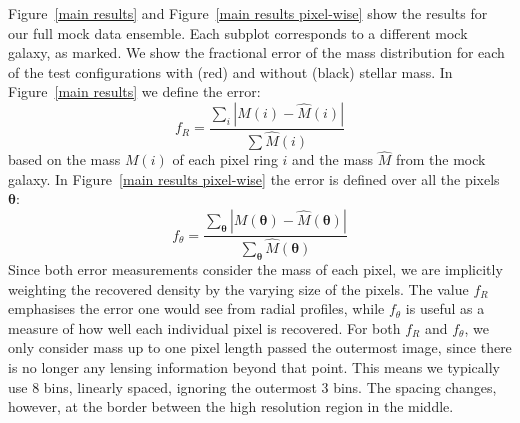 \documentclass[galley,usenatbib]{mn2e}
\renewcommand{\vec}[1]{\ensuremath{\boldsymbol{#1}}}
\newcommand{\figref}[1] {Figure~\ref{#1}}
\begin{document}
\figref{main results} and \figref{main results pixel-wise} show the results for
our full mock data ensemble. Each subplot corresponds to a different mock
galaxy, as marked. We show the fractional error of the mass distribution for
each of the test configurations with (red) and without (black) stellar mass. In
\figref{main results} we define the error:
%
\begin{equation} \label{ferror R}
  f_R = \frac {\sum_i \left|M(i) - \widehat M(i)\right| } {\sum \widehat M(i)}
\end{equation}
%
based on the mass $M(i)$ of each pixel ring $i$ and the mass $\widehat M$ from the mock galaxy. 
In \figref{main results pixel-wise} the error is defined over all the pixels $\vec\theta$:
%
\begin{equation} \label{ferror theta}
f_\theta = \frac {\sum_{\vec\theta} \left|M(\vec\theta) - \widehat M(\vec\theta)\right| } {\sum_{\vec\theta} \widehat M(\vec\theta)}
\end{equation}
%
Since both error measurements consider the mass of each pixel, we are
implicitly weighting the recovered density by the varying size of the pixels.
The value $f_R$ emphasises the error one would see from radial profiles, while
$f_\theta$ is useful as a measure of how well each individual pixel is recovered.
For both $f_R$ and $f_\theta$, we only consider mass up to one pixel length passed the
outermost image, since there is no longer any lensing information beyond that
point. This means we typically use 8 bins, linearly spaced, ignoring the
outermost 3 bins.  The spacing changes, however, at the border between the high
resolution region in the middle.
\end{document}
